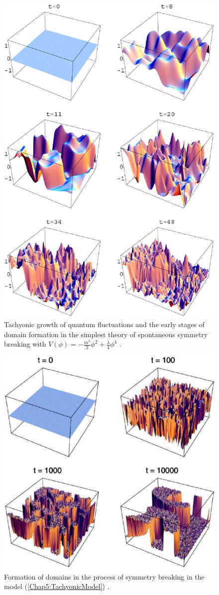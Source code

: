 \documentclass[11pt,a4paper,twoside]{book}
\begin{document}
\begin{figure}
	\centering
	\includegraphics[width=0.7\linewidth, height=0.45\textheight]{Images/Chap5/TachyonicInstability_Fig4}
	\caption{Tachyonic growth of quantum fluctuations and the early stages of domain formation in the simplest theory of spontaneous symmetry breaking with $ V(\phi)=-\frac{m^{2}}{2}\phi^{2} + \frac{\lambda}{4}\phi^{4}$ \cite{Chap5:TachyonicInstability}.}
	\label{fig:tachyonicinstabilityfig4}
\end{figure}
\begin{figure}
	\centering
	\includegraphics[width=0.7\linewidth, height=0.35\textheight]{Images/Chap5/TachyonicInstability_Fig5}
	\caption{Formation of domains in the process of symmetry breaking in the model (\ref{Chap5:TachyonicModel}) \cite{Chap5:TachyonicInstability}.}
	\label{fig:tachyonicinstabilityfig5}
\end{figure}
\end{document}
